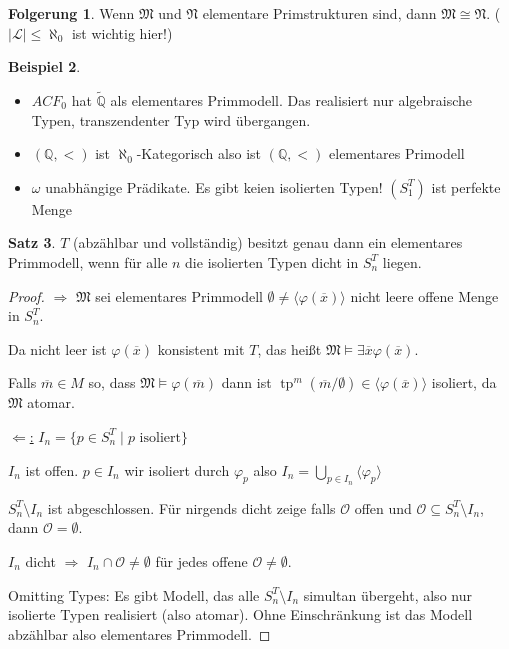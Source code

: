 \documentclass[12pt,parskip=full]{scrartcl}
\newcommand{\setQ}{\mathbb{Q}}
\newcommand{\abs}[1]{{\left| #1 \right|}}
\newcommand{\heading}{\underline}
\theoremstyle{definition}
\newtheorem{theorem}{Satz}[section]
\newtheorem{corollary}[theorem]{Folgerung}
\newtheorem{example}[theorem]{Beispiel}
\begin{document}
	\begin{corollary}
		Wenn $\mathfrak{M}$ und $\mathfrak{N}$ elementare Primstrukturen sind, dann $\mathfrak{M} \cong \mathfrak{N}$. ($\abs{\mathcal{L}} \leq \aleph_0$ ist wichtig hier!)
	\end{corollary}

	\begin{example}
		\begin{itemize}
			\item $ACF_0$ hat $\tilde{\setQ}$ als elementares Primmodell. Das realisiert nur algebraische Typen, transzendenter Typ wird übergangen.
			\item $(\setQ, <)$ ist $\aleph_0$-Kategorisch also ist $(\setQ, <)$ elementares Primodell
			\item $\omega$ unabhängige Prädikate. Es gibt keien isolierten Typen! $(S_1^T)$ ist perfekte Menge
		\end{itemize}
	\end{example}

	\begin{theorem}
		$T$ (abzählbar und vollständig) besitzt genau dann ein elementares Primmodell, wenn für alle $n$ die isolierten Typen dicht in $S_n^T$ liegen.
	\end{theorem}

	\begin{proof}
		\heading{$\Rightarrow$} $\mathfrak{M}$ sei elementares Primmodell $\emptyset \neq \langle \varphi(\overline{x}) \rangle$ nicht leere offene Menge in $S_n^T$.
		
		Da nicht leer ist $\varphi(\overline{x})$ konsistent mit $T$, das heißt $\mathfrak{M} \models \exists \overline{x} \varphi(\overline{x})$.
		
		Falls $\overline{m} \in M$ so, dass $\mathfrak{M} \models \varphi(\overline{m})$ dann ist $\operatorname{tp}^m(\overline{m} / \emptyset) \in \langle \varphi(\overline{x}) \rangle$ isoliert, da $\mathfrak{M}$ atomar.
		
		\heading{$\Leftarrow$:} $I_n = \{ p \in S_n^T \mid p \text{ isoliert} \}$
		
		$I_n$ ist offen. $p \in I_n$ wir isoliert durch $\varphi_p$ also $I_n = \bigcup_{p \in I_n} \langle \varphi_p \rangle$
		
		$S_n^T \setminus I_n$ ist abgeschlossen. Für nirgends dicht zeige falls $\mathcal{O}$ offen und $\mathcal{O} \subseteq S_n^T \setminus I_n$, dann $\mathcal{O} = \emptyset$.
		
		$I_n$ dicht $\Rightarrow$ $I_n \cap \mathcal{O}\neq \emptyset$ für jedes offene $\mathcal{O} \neq \emptyset$.
		
		Omitting Types: Es gibt Modell, das alle $S_n^T \setminus I_n$ simultan übergeht, also nur isolierte Typen realisiert (also atomar). Ohne Einschränkung ist das Modell abzählbar also elementares Primmodell.
	\end{proof}
\end{document}
